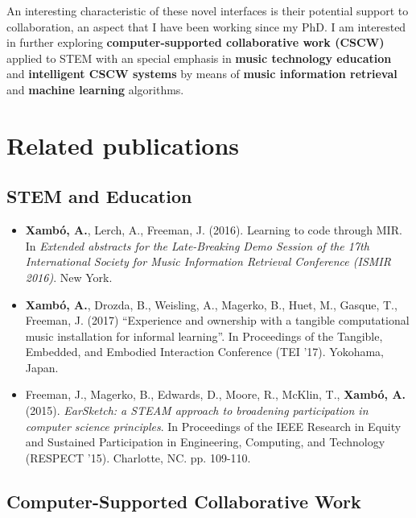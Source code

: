 \documentclass[10pt, a4paper]{article}
\begin{document}
An interesting characteristic of these novel interfaces is their potential support to collaboration, an aspect that I have been working since my PhD. I am interested in further exploring \textbf{computer-supported collaborative work (CSCW)} applied to STEM with an special emphasis in \textbf{music technology education} and \textbf{intelligent CSCW systems} by means of \textbf{music information retrieval} and \textbf{machine learning} algorithms.

\section*{Related publications}

\subsection*{STEM and Education}

\begin{itemize}
\item \textbf{Xambó, A.}, Lerch, A., Freeman, J. (2016). Learning to code through MIR. In \emph{Extended abstracts for the Late-Breaking Demo Session of the 17th International Society for Music Information Retrieval Conference (ISMIR 2016)}. New York.
\item \textbf{Xambó, A.}, Drozda, B., Weisling, A., Magerko, B., Huet, M., Gasque, T., Freeman, J. (2017) “Experience and ownership with a tangible computational music installation for informal learning”. In Proceedings of the Tangible, Embedded, and Embodied Interaction Conference (TEI ’17). Yokohama, Japan. 
\item Freeman, J., Magerko, B., Edwards, D., Moore, R., McKlin, T., \textbf{Xambó, A.} (2015). \emph{EarSketch: a STEAM approach to broadening participation in computer science principles}. In Proceedings of the IEEE Research in Equity and Sustained Participation in Engineering, Computing, and Technology (RESPECT '15). Charlotte, NC. pp. 109-110.
\end{itemize}

\subsection*{Computer-Supported Collaborative Work}
\end{document}
